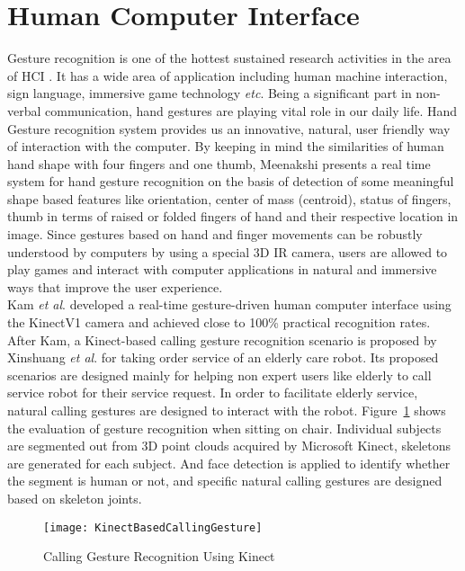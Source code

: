 \section{Human Computer Interface}
\indent
Gesture recognition is one of the hottest sustained research activities in the area of \gls{HCI} \cite{NIRGesture14}. It has a wide area of application including human machine interaction, sign language, immersive game technology \textit{etc}. Being a significant part in non-verbal communication, hand gestures are playing vital role in our daily life. Hand Gesture recognition system provides us an innovative, natural, user friendly way of interaction with the computer. By keeping in mind the similarities of human hand shape with four fingers and one thumb, Meenakshi \cite{gestureRecognition12} presents a real time system for hand gesture recognition on the basis of detection of some meaningful shape based features like orientation, center of mass (centroid), status of fingers, thumb in terms of raised or folded fingers of hand and their respective location in image. Since gestures based on hand and finger movements can be robustly understood by computers by using a special \gls{3D} \gls{IR} camera, users are allowed to play games and interact with computer applications in natural and immersive ways that improve the user experience. 
\\\indent
Kam \textit{et al}. \cite{KinectGesture12} developed a real-time gesture-driven human computer interface using the \gls{KinectV1} camera and achieved close to 100\% practical recognition rates. After Kam, a Kinect-based calling gesture recognition scenario is proposed by Xinshuang  \textit{et al}. \cite{gestureKinect14} for taking order service of an elderly care robot. Its proposed scenarios are designed mainly for helping non expert users like elderly to call service robot for their service request. In order to facilitate elderly service, natural calling gestures are designed to interact with the robot. Figure~\ref{KinectBasedCallingGesture} shows the evaluation of gesture recognition when sitting on chair. Individual subjects are segmented out from \gls{3D} point clouds acquired by Microsoft Kinect, skeletons are generated for each subject. And face detection is applied to identify whether the segment is human or not, and specific natural calling gestures are designed based on skeleton joints. %
\\\indent
\begin{figure}[t]
\centering
\texttt{[image: KinectBasedCallingGesture]}
\caption{Calling Gesture Recognition Using Kinect \cite{gestureKinect14}}
\label{KinectBasedCallingGesture}
\end{figure}%
